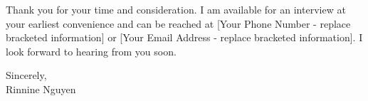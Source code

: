 \documentclass[letterpaper,11pt]{article}
\begin{document}
\vspace{10pt}

Thank you for your time and consideration. I am available for an interview at your earliest convenience and can be reached at [Your Phone Number - replace bracketed information] or [Your Email Address - replace bracketed information]. I look forward to hearing from you soon.


\vspace{20pt}

Sincerely, \\
\vspace{40pt}
Rinnine Nguyen
\end{document}
